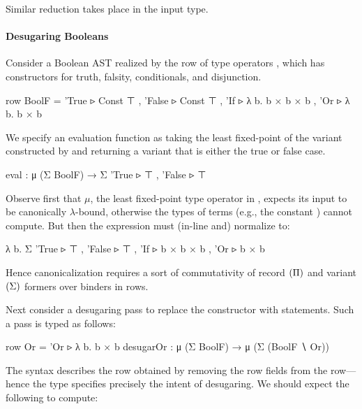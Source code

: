 \documentclass[sigplan,screen]{acmart}
\begin{document}
\Ni Similar reduction takes place in the input type.

\paragraph{Desugaring Booleans}

Consider a Boolean AST realized by the row of type operators , which has constructors for truth, falsity, conditionals, and disjunction.

\begin{rosi} 
row BoolF = {'True ▹ Const ⊤ , 'False ▹ Const ⊤ , 
              'If ▹ λ b. b × b × b , 'Or ▹ λ b. b × b}  
\end{rosi}

We specify an evaluation function as taking the least fixed-point of the variant constructed by  and returning a variant that is either the true or false case.

\begin{rosi}
eval : μ (Σ BoolF) → Σ {'True ▹ ⊤ , 'False ▹ ⊤}
\end{rosi}

Observe first that $\mu$, the least fixed-point type operator in \Rome, expects its input to be canonically $\lambda$-bound, otherwise the types of terms (e.g., the constant  \R{:}   ) cannot compute. But then the expression  must (in-line and) normalize to:  %

\begin{rosi}
λ b. Σ {'True ▹ ⊤ , 'False ▹ ⊤ , 
        'If ▹ b × b × b , 'Or ▹ b × b}  
\end{rosi}

\Ni Hence canonicalization requires a sort of commutativity of record $({\Pi})$ and variant $({\Sigma})$ formers over binders in rows.

Next consider a desugaring pass to replace the  constructor with  statements. Such a pass is typed as follows:

\begin{rosi}
row Or    = {'Or ▹ λ b. b × b}
desugarOr : μ (Σ BoolF) → μ (Σ (BoolF ∖ Or))
\end{rosi}

\Ni The syntax  describes the row obtained by removing the  row fields from the  row---hence the type specifies precisely the intent of desugaring. We should expect the following to compute:
\end{document}
